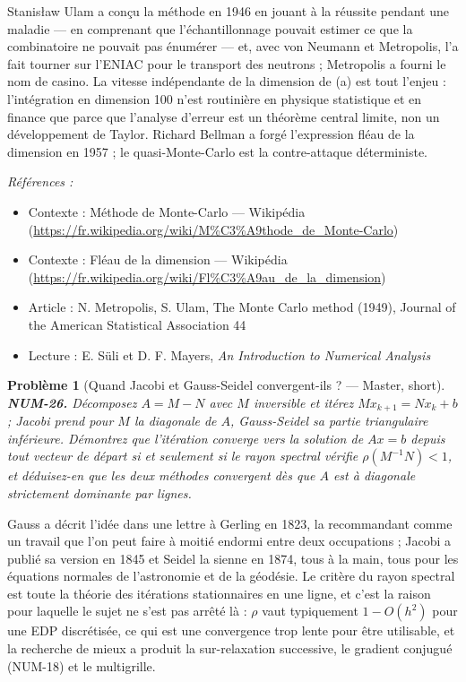 \documentclass[11pt]{article}
\newtheorem{problem}{Problème}
\newenvironment{refs}{\par\small\noindent\emph{Références :}\begin{itemize}\setlength\itemsep{0pt}}{\end{itemize}\normalsize}
\begin{document}
\noindent Stanis\l{}aw Ulam a conçu la méthode en 1946 en jouant à la réussite
pendant une maladie --- en comprenant que l'échantillonnage pouvait estimer ce que la
combinatoire ne pouvait pas énumérer --- et, avec von Neumann et Metropolis, l'a fait
tourner sur l'ENIAC pour le transport des neutrons ; Metropolis a fourni le nom de
casino. La vitesse indépendante de la dimension de (a) est tout l'enjeu : l'intégration
en dimension 100 n'est routinière en physique statistique et en finance que parce que
l'analyse d'erreur est un théorème central limite, non un développement de Taylor.
Richard Bellman a forgé l'expression \og{} fléau de la dimension \fg{} en 1957 ; le
quasi-Monte-Carlo est la contre-attaque déterministe.

\begin{refs}
\item Contexte : Méthode de Monte-Carlo --- Wikipédia (\url{https://fr.wikipedia.org/wiki/M%C3%A9thode_de_Monte-Carlo})
\item Contexte : Fléau de la dimension --- Wikipédia (\url{https://fr.wikipedia.org/wiki/Fl%C3%A9au_de_la_dimension})
\item Article : N. Metropolis, S. Ulam, \og{} The Monte Carlo method \fg{} (1949), Journal of the American Statistical Association 44
\item Lecture : E. Süli et D. F. Mayers, \textit{An Introduction to Numerical Analysis}
\end{refs}

\bigskip

\begin{problem}[{Quand Jacobi et Gauss-Seidel convergent-ils ? --- Master, short}]
\textbf{NUM-26.} Décomposez $A = M - N$ avec $M$ inversible et itérez $M x_{k+1} = N x_k + b$ ; Jacobi prend pour $M$ la diagonale de $A$, Gauss-Seidel sa partie triangulaire inférieure. Démontrez que l'itération converge vers la solution de $Ax = b$ depuis tout vecteur de départ si et seulement si le rayon spectral vérifie $\rho(M^{-1}N) < 1$, et déduisez-en que les deux méthodes convergent dès que $A$ est à diagonale strictement dominante par lignes.
\end{problem}

\noindent Gauss a décrit l'idée dans une lettre à Gerling en 1823, la recommandant comme un travail que l'on peut faire \og{} à moitié endormi \fg{} entre deux occupations ; Jacobi a publié sa version en 1845 et Seidel la sienne en 1874, tous à la main, tous pour les équations normales de l'astronomie et de la géodésie. Le critère du rayon spectral est toute la théorie des itérations stationnaires en une ligne, et c'est la raison pour laquelle le sujet ne s'est pas arrêté là : $\rho$ vaut typiquement $1 - O(h^2)$ pour une EDP discrétisée, ce qui est une convergence trop lente pour être utilisable, et la recherche de mieux a produit la sur-relaxation successive, le gradient conjugué (NUM-18) et le multigrille.
\end{document}

